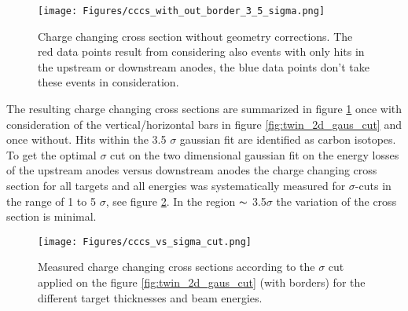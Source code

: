 \begin{figure}[htpb]
    \centering
    \texttt{[image: Figures/cccs\_with\_out\_border\_3\_5\_sigma.png]}
    \caption{
    Charge changing cross section without geometry corrections. The red data points result from considering also events with only hits in the upstream or downstream anodes, the blue data points don't take these events in consideration. 
     }
    \label{fig:cccs_with_out_border_3_5}
\end{figure}
The resulting charge changing cross sections are summarized in figure \ref{fig:cccs_with_out_border_3_5} once with consideration of the vertical/horizontal bars in figure \ref{fig:twin_2d_gaus_cut} and once without. Hits within the 3.5 $\sigma$ gaussian fit are identified as carbon isotopes.
To get the optimal $\sigma$ cut on the two dimensional gaussian fit on the energy losses of the upstream anodes versus downstream anodes the charge changing cross section for all targets and all energies was systematically measured for $\sigma$-cuts in the range of 1 to 5 $\sigma$, see figure \ref{fig:cccs_vs_sigma_cut}. In the region $\thicksim$ 3.5$\sigma$ the variation of the cross section is minimal.
\begin{figure}[htpb]
    \centering
    \texttt{[image: Figures/cccs\_vs\_sigma\_cut.png]}
    \caption{
    Measured charge changing cross sections according to the $\sigma$ cut applied on the figure \ref{fig:twin_2d_gaus_cut} (with borders) for the different target thicknesses and beam energies.
     }
    \label{fig:cccs_vs_sigma_cut}
\end{figure}
